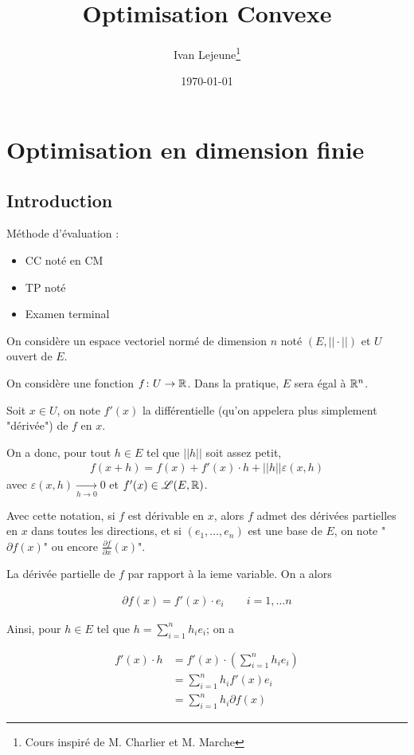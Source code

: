 \documentclass[french,a4paper,10pt]{article}
\title{\color{astral} \sffamily \bfseries Optimisation Convexe}
\author{Ivan Lejeune\thanks{Cours inspiré de M. Charlier et M. Marche}}
\date{\today}
\begin{document}
	
	\maketitle
	\section{Optimisation en dimension finie}
	\subsection{Introduction}
	Méthode d'évaluation :
	\begin{itemize}
		\item CC noté en CM
		\item TP noté
		\item Examen terminal
	\end{itemize}
	On considère un espace vectoriel normé de dimension $n$ noté $(E, ||\cdot||)$ et $U$ ouvert de $E$.
	
	On considère une fonction $f\colon U\to \mathbb{R}$. Dans la pratique, $E$ sera égal à $\mathbb{R}^n$.
	
	Soit $x\in U$, on note $f'(x)$ la différentielle (qu'on appelera plus simplement "dérivée") de $f$ en $x$. 
	
	On a donc, pour tout $h\in E$ tel que $||h||$ soit assez petit, 
		\[\begin{aligned}
			f(x+h)=f(x)+f'(x)\cdot h+||h||\varepsilon(x, h)
		\end{aligned}\]
		avec $\varepsilon(x, h)\underset{h\to 0}\to 0$
		et $f'(x)\in\mathscr{L}(E, \mathbb{R})$.
		
	Avec cette notation, si $f$ est dérivable en $x$, alors $f$ admet des dérivées partielles en $x$ dans toutes les directions, et si $(e_1,\dots,e_n)$ est une base de $E$, on note "$\partial f(x)$" ou encore $\frac{\partial f}{\partial x}(x)$".
	
	La dérivée partielle de $f$ par rapport à la ieme variable. On a alors
	
		\[\begin{aligned}
			\partial f(x)=f'(x)\cdot e_i\qquad i=1,\dots n
		\end{aligned}\]
	
	Ainsi, pour $h\in E$ tel que $h=\sum_{i=1}^nh_ie_i$; on a
	
		\[\begin{aligned}
			f'(x)\cdot h &= f'(x)\cdot\left(\sum_{i=1}^nh_ie_i\right)\\
			&=\sum_{i=1}^n h_i f'(x) e_i\\
			&=\sum_{i=1}^{n} h_i\partial f(x)
		\end{aligned}\]
	
\end{document}
